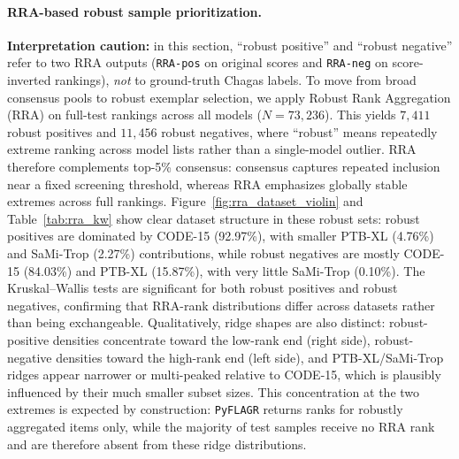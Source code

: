 \paragraph{RRA-based robust sample prioritization.}
\textbf{Interpretation caution:} in this section, ``robust positive'' and ``robust negative'' refer to two RRA outputs (\texttt{RRA-pos} on original scores and \texttt{RRA-neg} on score-inverted rankings), \emph{not} to ground-truth Chagas labels.
To move from broad consensus pools to robust exemplar selection, we apply Robust Rank Aggregation (RRA) on full-test rankings across all models (\(N=73{,}236\)).
This yields \(7{,}411\) robust positives and \(11{,}456\) robust negatives, where ``robust'' means repeatedly extreme ranking across model lists rather than a single-model outlier.
RRA therefore complements top-5\% consensus: consensus captures repeated inclusion near a fixed screening threshold, whereas RRA emphasizes globally stable extremes across full rankings.
Figure~\ref{fig:rra_dataset_violin} and Table~\ref{tab:rra_kw} show clear dataset structure in these robust sets: robust positives are dominated by CODE-15 (92.97\%), with smaller PTB-XL (4.76\%) and SaMi-Trop (2.27\%) contributions, while robust negatives are mostly CODE-15 (84.03\%) and PTB-XL (15.87\%), with very little SaMi-Trop (0.10\%).
The Kruskal--Wallis tests are significant for both robust positives and robust negatives, confirming that RRA-rank distributions differ across datasets rather than being exchangeable.
Qualitatively, ridge shapes are also distinct: robust-positive densities concentrate toward the low-rank end (right side), robust-negative densities toward the high-rank end (left side), and PTB-XL/SaMi-Trop ridges appear narrower or multi-peaked relative to CODE-15, which is plausibly influenced by their much smaller subset sizes.
This concentration at the two extremes is expected by construction: \texttt{PyFLAGR} returns ranks for robustly aggregated items only, while the majority of test samples receive no RRA rank and are therefore absent from these ridge distributions.

